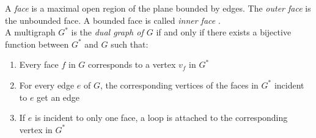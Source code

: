 A \emph{face} is a maximal open region of the plane bounded by edges. The \emph{outer face} is the unbounded face. A bounded face is called \emph{inner face} \cite[S. 86]{Diestel_GraphTheory}.\\
A multigraph $G^*$ is the \emph{dual graph of $G$} if and only if there exists a bijective function between $G^*$ and $G$ such that:
\begin{enumerate}
	\item Every face $f$ in $G$ corresponds to a vertex $v_f$ in $G^*$
	\item For every edge $e$ of $G$, the corresponding vertices of the faces in $G^*$ incident to $e$ get an edge 
	\item If $e$ is incident to only one face, a loop is attached to the corresponding vertex in $G^*$
\end{enumerate}\cite[P. 103]{Diestel_GraphTheory}


